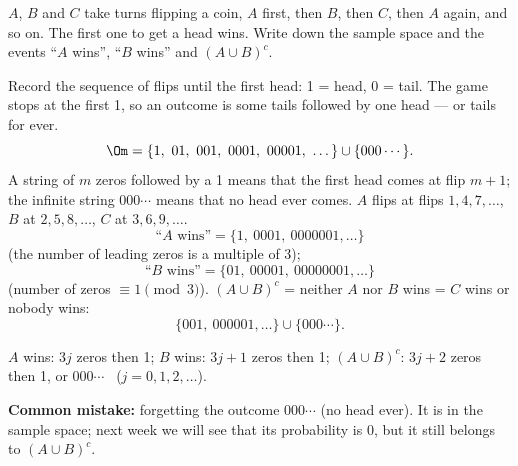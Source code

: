 
\begin{problem}
	$A$, $B$ and $C$ take turns flipping a coin, $A$ first, then $B$, then $C$,
	then $A$ again, and so on. The first one to get a head wins. Write down the
	sample space and the events ``$A$ wins'', ``$B$ wins'' and $(A\cup B)^c$.
\end{problem}

\begin{solution}
	\idea Record the sequence of flips until the first head: 1 = head, 0 =
	tail. The game stops at the first 1, so an outcome is some tails followed by
	one head --- or tails for ever.
	\[ \Om=\{1,\ 01,\ 001,\ 0001,\ 00001,\ \dots\}\cup\{000\cdots\}. \]
	A string of $m$ zeros followed by a 1 means that the first head comes at flip
	$m+1$; the infinite string $000\cdots$ means that no head ever comes.
	 $A$ flips at flips $1,4,7,\dots$, $B$ at
	$2,5,8,\dots$, $C$ at $3,6,9,\dots$.
	\[ \text{“$A$ wins”}=\{1,\ 0001,\ 0000001,\dots\} \]
	(the number of leading zeros is a multiple of 3);
	\[ \text{“$B$ wins”}=\{01,\ 00001,\ 00000001,\dots\} \]
	(number of zeros $\equiv1\pmod 3$).
	$(A\cup B)^c$ = neither $A$ nor $B$ wins = $C$ wins or nobody wins:
	\[ \{001,\ 000001,\dots\}\cup\{000\cdots\}. \]
	\begin{answer}
		$A$ wins: $3j$ zeros then 1; $B$ wins: $3j+1$ zeros then 1;
		$(A\cup B)^c$: $3j+2$ zeros then 1, or $000\cdots$ \ ($j=0,1,2,\dots$).
	\end{answer}
	\begin{remark}
		\textbf{Common mistake:} forgetting the outcome $000\cdots$ (no head ever).
		It is in the sample space; next week we will see that its probability is
		0, but it still belongs to $(A\cup B)^c$.
	\end{remark}
\end{solution}
